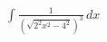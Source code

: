 \documentclass[preview]{standalone}
\begin{document}
\begin{align*}
\int \frac{1}{(\sqrt{2^2x^2-4^2})^3} \, dx
\end{align*}
\end{document}
